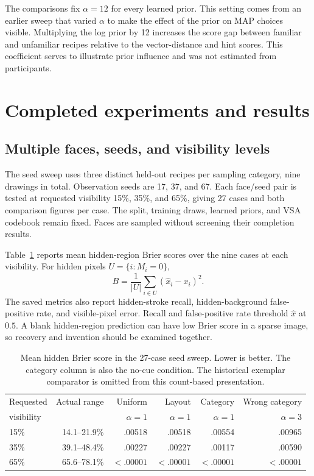 \documentclass[11pt,letterpaper]{article}
\begin{document}
The comparisons fix $\alpha=12$ for every learned prior. This setting comes from an earlier sweep that varied $\alpha$ to make the effect of the prior on MAP choices visible. Multiplying the log prior by 12 increases the score gap between familiar and unfamiliar recipes relative to the vector-distance and hint scores. This coefficient serves to illustrate prior influence and was not estimated from participants.

\section{Completed experiments and results}
\subsection{Multiple faces, seeds, and visibility levels}
The seed sweep uses three distinct held-out recipes per sampling category, nine drawings in total. Observation seeds are 17, 37, and 67. Each face/seed pair is tested at requested visibility 15\%, 35\%, and 65\%, giving 27 cases and both comparison figures per case. The split, training draws, learned priors, and VSA codebook remain fixed. Faces are sampled without screening their completion results.

Table~\ref{tab:brier} reports mean hidden-region Brier scores over the nine cases at each visibility. For hidden pixels $U=\{i:M_i=0\}$,
\begin{equation}
B=\frac{1}{|U|}\sum_{i\in U}(\widehat x_i-x_i)^2.
\end{equation}
The saved metrics also report hidden-stroke recall, hidden-background false-positive rate, and visible-pixel error. Recall and false-positive rate threshold $\widehat x$ at $0.5$. A blank hidden-region prediction can have low Brier score in a sparse image, so recovery and invention should be examined together.

\begin{table}[htbp]
\centering\small
\begin{tabular}{lrrrrr}
\toprule
Requested & Actual range & Uniform & Layout & Category & Wrong category \\
visibility & & $\alpha=1$ & $\alpha=1$ & $\alpha=1$ & $\alpha=3$ \\
\midrule
15\% & 14.1--21.9\% & .00518 & .00518 & .00554 & .00965 \\
35\% & 39.1--48.4\% & .00227 & .00227 & .00117 & .00590 \\
65\% & 65.6--78.1\% & $<.00001$ & $<.00001$ & $<.00001$ & $<.00001$ \\
\bottomrule
\end{tabular}
\caption{Mean hidden Brier score in the 27-case seed sweep. Lower is better. The category column is also the no-cue condition. The historical exemplar comparator is omitted from this count-based presentation.}
\label{tab:brier}
\end{table}
\end{document}

